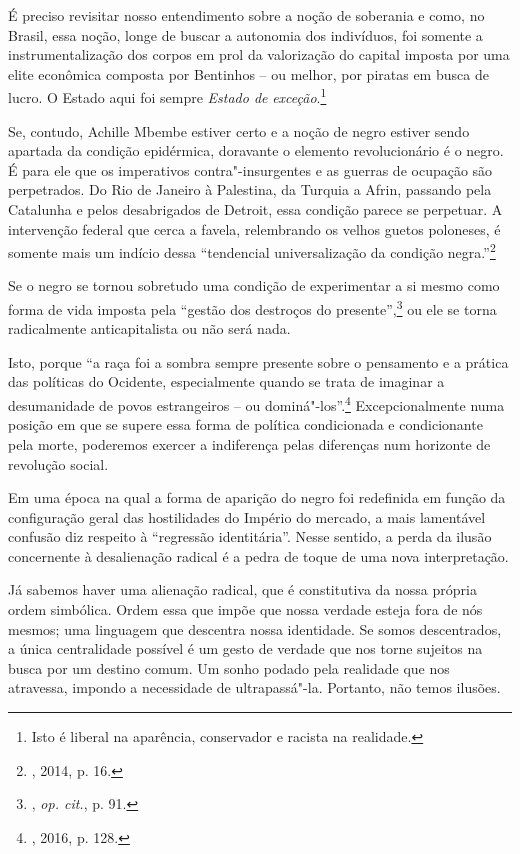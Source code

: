 É preciso revisitar nosso entendimento sobre a noção de soberania e
como, no Brasil, essa noção, longe de buscar a autonomia dos indivíduos,
foi somente a instrumentalização dos corpos em prol da valorização do
capital imposta por uma elite econômica composta por Bentinhos -- ou
melhor, por piratas em busca de lucro. O Estado aqui foi sempre
\emph{Estado de} \emph{exceção}.\footnote{Isto
  é liberal na aparência, conservador e racista na realidade.}

Se, contudo, Achille Mbembe estiver certo e a noção de negro estiver
sendo apartada da condição epidérmica, doravante o elemento
revolucionário é o negro. É para ele que os imperativos
contra"-insurgentes e as guerras de ocupação são perpetrados. Do Rio de
Janeiro à Palestina, da Turquia a Afrin, passando pela Catalunha e pelos
desabrigados de Detroit, essa condição parece se perpetuar. A
intervenção federal que cerca a favela, relembrando os velhos guetos
poloneses, é somente mais um indício dessa ``tendencial universalização
da condição negra.''\footnote{, 2014, p. 16.}

Se o negro se tornou sobretudo uma condição de experimentar a si mesmo
como forma de vida imposta pela ``gestão dos destroços do
presente'',\footnote{, \emph{op. cit.}, p. 91.} ou ele se torna
radicalmente anticapitalista ou não será nada.

Isto, porque ``a raça foi a sombra sempre presente sobre o pensamento e
a prática das políticas do Ocidente, especialmente quando se trata de
imaginar a desumanidade de povos estrangeiros -- ou
dominá"-los''.\footnote{, 2016, p. 128.} Excepcionalmente numa
posição em que se supere essa forma de política condicionada e
condicionante pela morte, poderemos exercer a indiferença pelas
diferenças num horizonte de revolução social.

Em uma época na qual a forma de aparição do negro foi redefinida em
função da configuração geral das hostilidades do Império do mercado, a
mais lamentável confusão diz respeito à ``regressão identitária''. Nesse
sentido, a perda da ilusão concernente à desalienação radical é a pedra
de toque de uma nova interpretação.

Já sabemos haver uma alienação radical, que é constitutiva da nossa
própria ordem simbólica. Ordem essa que impõe que nossa verdade esteja
fora de nós mesmos; uma linguagem que descentra nossa identidade. Se
somos descentrados, a única centralidade possível é um gesto de verdade
que nos torne sujeitos na busca por um destino comum. Um sonho podado
pela realidade que nos atravessa, impondo a necessidade de
ultrapassá"-la. Portanto, não temos ilusões.

